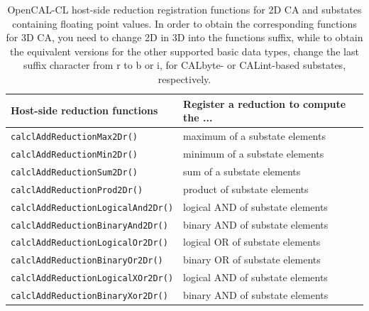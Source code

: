 \begin{table}
  \centering
  \footnotesize
  \begin{tabular}{l|l}
    \hline
    Host-side reduction functions & Register a reduction to compute the ... \\
    \hline
    \verb'calclAddReductionMax2Dr()'        & maximum of a substate elements\\
    \verb'calclAddReductionMin2Dr()'        & minimum of a substate elements\\
    \verb'calclAddReductionSum2Dr()'        & sum of a substate elements\\
    \verb'calclAddReductionProd2Dr()'       & product of substate elements\\
    \verb'calclAddReductionLogicalAnd2Dr()' & logical AND of substate elements\\
    \verb'calclAddReductionBinaryAnd2Dr()'  & binary AND of substate elements\\
    \verb'calclAddReductionLogicalOr2Dr()'  & logical OR of substate elements\\
    \verb'calclAddReductionBinaryOr2Dr()'   & binary OR of substate elements\\
    \verb'calclAddReductionLogicalXOr2Dr()' & logical AND of substate elements\\
    \verb'calclAddReductionBinaryXor2Dr()'  & binary AND of substate elements\\
    \hline
  \end{tabular}
  \caption{OpenCAL-CL host-side reduction registration functions for 2D CA and
    substates containing floating point values. In order to obtain the
    corresponding functions for 3D CA, you need to change 2D in 3D
    into the functions suffix, while to obtain the equivalent
    versions for the other supported basic data types, change the last
    suffix character from r to b or i, for CALbyte- or CALint-based
    substates, respectively.}
  \label{tab:calcl-host-reductions}
\end{table}


